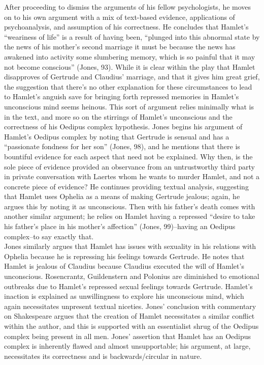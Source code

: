 \documentclass[12pt]{article}
\begin{document}
\indent After proceeding to dismiss the arguments of his fellow psychologists, he moves on to his own argument with a mix of text-based evidence, applications of psychoanalysis, and assumption of his correctness. He concludes that Hamlet's ``weariness of life'' is a result of having been, ``plunged into this abnormal state by the news of his mother's second marriage it must be because the news has awakened into activity some slumbering memory, which is so painful that it may not become conscious'' (Jones, 93). While it is clear within the play that Hamlet disapproves of Gertrude and Claudius' marriage, and that it gives him great grief, the suggestion that there's no other explanation for these circumstances to lead to Hamlet's anguish save for bringing forth repressed memories in Hamlet's unconscious mind seems heinous. This sort of argument relies minimally what is in the text, and more so on the stirrings of Hamlet's unconscious and the correctness of his Oedipus complex hypothesis. Jones begins his argument of Hamlet's Oedipus complex by noting that Gertrude is sensual and has a ``passionate fondness for her son'' (Jones, 98), and he mentions that there is bountiful evidence for each aspect that need not be explained. Why then, is the sole piece of evidence provided an observance from an untrustworthy third party in private conversation with Laertes whom he wants to murder Hamlet, and not a concrete piece of evidence? He continues providing textual analysis, suggesting that Hamlet uses Ophelia as a means of making Gertrude jealous; again, he argues this by noting it as unconscious. Then with his father's death comes with another similar argument; he relies on Hamlet having a repressed ``desire to take his father's place in his mother's affection'' (Jones, 99)--having an Oedipus complex--to say exactly that.\\
\indent Jones similarly argues that Hamlet has issues with sexuality in his relations with Ophelia because he is repressing his feelings towards Gertrude. He notes that Hamlet is jealous of Claudius because Claudius executed the will of Hamlet's unconscious. Rosencrantz, Guildenstern and Polonius are diminished to emotional outbreaks due to Hamlet's repressed sexual feelings towards Gertrude. Hamlet's inaction is explained as unwillingness to explore his unconscious mind, which again necessitates unpresent textual niceties. Jones' conclusion with commentary on Shakespeare argues that the creation of Hamlet necessitates a similar conflict within the author, and this is supported with an essentialist shrug of the Oedipus complex being present in all men. Jones' assertion that Hamlet has an Oedipus complex is inherently flawed and almost unsupportable; his argument, at large, necessitates its correctness and is backwards/circular in nature.\\
\end{document}
